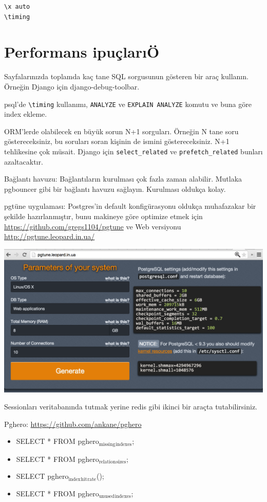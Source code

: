 \documentclass[11pt]{article}
\begin{document}
\begin{verbatim}
\x auto
\timing
\end{verbatim}


\section{Performans ipuçlarıÖ}
\label{sec-3}

Sayfalarınızda toplamda kaç tane SQL sorgusunun gösteren bir araç
kullanın. Örneğin Django için django-debug-toolbar.

psql'de \texttt{\textbackslash{}timing} kullanımı, \texttt{ANALYZE} ve \texttt{EXPLAIN ANALYZE} komutu ve buna göre index
ekleme.

ORM'lerde olabilecek en büyük sorun N+1 sorguları. Örneğin N tane soru
göstereceksiniz, bu soruları soran kişinin de ismini göstereceksiniz. N+1
tehlikesine çok müsait. Django için \texttt{select\_related} ve \texttt{prefetch\_related} bunları
azaltacaktır.

Bağlantı havuzu: Bağlantıların kurulması çok fazla zaman alabilir. Mutlaka
pgbouncer gibi bir bağlantı havuzu sağlayın. Kurulması oldukça kolay.

pgtüne uygulaması: Postgres'in default konfigürasyonu oldukça muhafazakar bir
şekilde hazırlanmıştır, bunu makineye göre optimize etmek için
\url{https://github.com/gregs1104/pgtune} ve Web versiyonu
\url{http://pgtune.leopard.in.ua/}

\includegraphics[width=.9\linewidth]{./pgtune.png}

Sessionları veritabanında tutmak yerine redis gibi ikinci bir araçta
tutabilirsiniz.

Pghero: \url{https://github.com/ankane/pghero}

\begin{itemize}
\item SELECT * FROM pghero$_{\text{missing}}$$_{\text{indexes}}$;
\item SELECT * FROM pghero$_{\text{relation}}$$_{\text{sizes}}$;
\item SELECT pghero$_{\text{index}}$$_{\text{hit}}$$_{\text{rate}}$();
\item SELECT * FROM pghero$_{\text{unused}}$$_{\text{indexes}}$;
\end{itemize}
\end{document}
